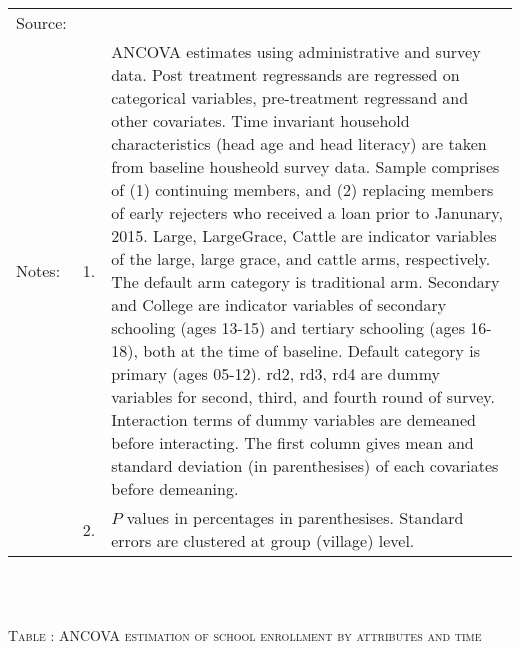 \begin{minipage}[t]{14cm}
\begin{tabular}{>{\hfill\scriptsize}p{1cm}<{}>{\hfill\scriptsize}p{.25cm}<{}>{\scriptsize}p{12cm}<{\hfill}}
Source:& \multicolumn{2}{l}{\scriptsize Estimated with GUK administrative and survey data.}\\
Notes: & 1. & ANCOVA estimates using administrative and survey data. Post treatment regressands are regressed on categorical variables, pre-treatment regressand and other covariates. Time invariant household characteristics (head age and head literacy) are taken from baseline housheold survey data. Sample comprises of (1) continuing members, and (2) replacing members of early rejecters who received a loan prior to Janunary, 2015.  \textsf{Large}, \textsf{LargeGrace}, \textsf{Cattle} are indicator variables of the \textsf{large}, \textsf{large grace}, and \textsf{cattle} arms, respectively. The default arm category is \textsf{traditional} arm. \textsf{Secondary} and \textsf{College} are indicator variables of secondary schooling (ages 13-15) and tertiary schooling (ages 16-18), both at the time of baseline. Default category is primary (ages 05-12). \textsf{rd2, rd3, rd4} are dummy variables for second, third, and fourth round of survey. Interaction terms of dummy variables are demeaned before interacting. The first column gives mean and standard deviation (in parenthesises) of each covariates before demeaning. \\
& 2. & $P$ values in percentages in parenthesises. Standard errors are clustered at group (village) level. %
 \end{tabular}
\end{minipage} \\\\\hspace{-1cm}\begin{minipage}[t]{14cm} \hfil\textsc{\normalsize Table \thetable: ANCOVA estimation of school enrollment by attributes and time\label{tab ANCOVA enroll time varying attributes}}\\ \setlength{\tabcolsep}{1pt}
  \setlength{\baselineskip}{8pt}
  \renewcommand{\arraystretch}{.55}
  \hfil{}\\
\renewcommand{\arraystretch}{.8}
\setlength{\tabcolsep}{1pt} \begin{tabular}{>{\hfill\scriptsize}p{1cm}<{}>{\hfill\scriptsize}p{.25cm}<{}>{\scriptsize}p{12cm}<{\hfill}} 

\end{tabular}
\end{minipage}
